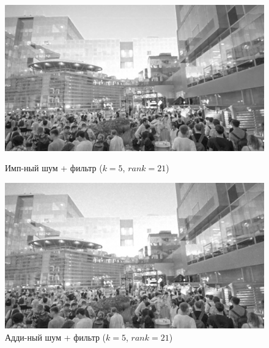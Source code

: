 \documentclass[a4paper]{article}
\begin{document}
\begin{figure}[H]
    \begin{minipage}{0.49\textwidth}
        \centering \includegraphics[width=\textwidth]{images/3_nonlinear_filters/impulse - rang (k=5, rank=21).jpg}
        \caption{Имп-ный шум + фильтр ($k = 5$, $rank = 21$)}
    \end{minipage}\hfill
    \begin{minipage}{0.49\textwidth}
        \centering \includegraphics[width=\textwidth]{images/3_nonlinear_filters/additive - rang (k=5, rank=21).jpg}
        \caption{Адди-ный шум + фильтр ($k = 5$, $rank = 21$)}
    \end{minipage}
\end{figure}
\end{document}
